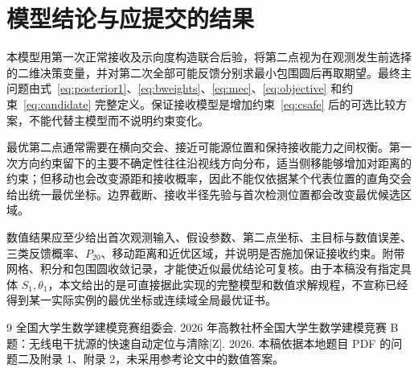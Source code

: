 \documentclass[UTF8,a4paper,zihao=-4,fontset=none]{ctexart}
\numberwithin{equation}{section}
\theoremstyle{definition}
\begin{document}
\section{模型结论与应提交的结果}
本模型用第一次正常接收及示向度构造联合后验，将第二点视为在观测发生前选择的二维决策变量，并对第二次全部可能反馈分别求最小包围圆后再取期望。最终主问题由式~\eqref{eq:posterior1}、\eqref{eq:bweights}、\eqref{eq:mec}、\eqref{eq:objective} 和约束~\eqref{eq:candidate} 完整定义。保证接收模型是增加约束~\eqref{eq:csafe} 后的可选比较方案，不能代替主模型而不说明约束变化。

最优第二点通常需要在横向交会、接近可能源位置和保持接收能力之间权衡。第一次方向约束留下的主要不确定性往往沿视线方向分布，适当侧移能够增加对距离的约束；但移动也会改变源距和接收概率，因此不能仅依据某个代表位置的直角交会给出统一最优坐标。边界截断、接收半径先验与首次检测位置都会改变最优候选区域。

数值结果应至少给出首次观测输入、假设参数、第二点坐标、主目标与数值误差、三类反馈概率、\(P_{20}\)、移动距离和近优区域，并说明是否施加保证接收约束。附带网格、积分和包围圆收敛记录，才能使近似最优结论可复核。由于本稿没有指定具体 \(S_1,\theta_1\)，本文给出的是可直接据此实现的完整模型和数值求解规程，不宣称已经得到某一实际实例的最优坐标或连续域全局最优证书。

\begin{thebibliography}{9}
 全国大学生数学建模竞赛组委会. 2026 年高教社杯全国大学生数学建模竞赛 B 题：无线电干扰源的快速自动定位与清除[Z]. 2026. 本稿依据本地题目 PDF 的问题二及附录 1、附录 2，未采用参考论文中的数值答案。
\end{thebibliography}
\end{document}
